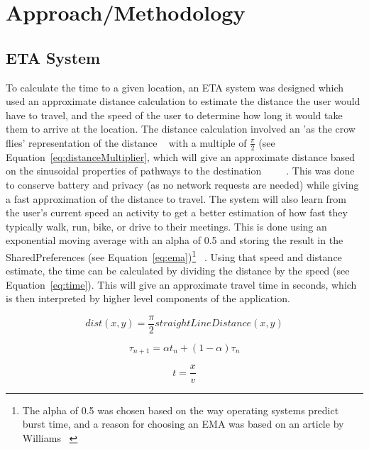 \section{Approach/Methodology}

\subsection{ETA System}
To calculate the time to a given location, an ETA system was designed which used an approximate distance calculation to estimate the distance the user would have to travel, and the speed of the user to determine how long it would take them to arrive at the location. The distance calculation involved an 'as the crow flies' representation of the distance ~\cite{androidlocation} with a multiple of $\frac{\pi}{2}$ (see Equation~\ref{eq:distanceMultiplier}, which will give an approximate distance based on the sinusoidal properties of pathways to the destination ~\cite{numberphile2014pi} ~\cite{edwards2004crow} ~\cite{lembo2003crow}. This was done to conserve battery and privacy (as no network requests are needed) while giving a fast approximation of the distance to travel. The system will also learn from the user's current speed an activity to get a better estimation of how fast they typically walk, run, bike, or drive to their meetings. This is done using an exponential moving average with an alpha of 0.5 and storing the result in the SharedPreferences (see Equation~\ref{eq:ema})\footnote{The alpha of 0.5 was chosen based on the way operating systems predict burst time, and a reason for choosing an EMA was based on an article by Williams ~\cite{williams1998urban}} ~\cite{williams1998urban}. Using that speed and distance estimate, the time can be calculated by dividing the distance by the speed (see Equation~\ref{eq:time}). This will give an approximate travel time in seconds, which is then interpreted by higher level components of the application.

\begin{equation}\label{eq:distanceMultiplier}
	dist(x, y) = \frac{\pi}{2} straightLineDistance(x, y)
\end{equation}

\begin{equation}\label{eq:ema}
	\tau_{n+1} = \alpha t_n + (1 - \alpha) \tau_n
\end{equation}

\begin{equation}\label{eq:time}
	t = \frac{x}{v}
\end{equation}